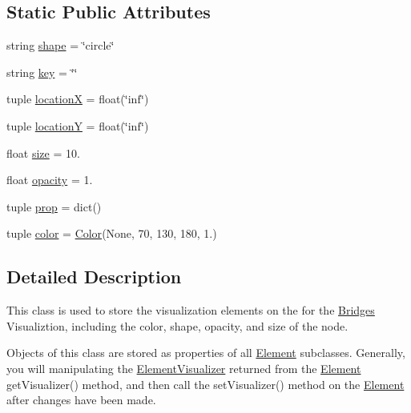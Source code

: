 \subsection*{Static Public Attributes}
\begin{DoxyCompactItemize}
\item 
string \hyperlink{class_bridges_1_1_element_visualizer_1_1_element_visualizer_a1ae8dcb88a4ccb84df24aafed271ea7f}{shape} = \char`\"{}circle\char`\"{}
\item 
string \hyperlink{class_bridges_1_1_element_visualizer_1_1_element_visualizer_ae811539c6b7d514dcaead30f0288c87d}{key} = \char`\"{}\char`\"{}
\item 
tuple \hyperlink{class_bridges_1_1_element_visualizer_1_1_element_visualizer_a0e49a616ae03929c2fd740d4c63d6783}{location\+X} = float(\char`\"{}inf\char`\"{})
\item 
tuple \hyperlink{class_bridges_1_1_element_visualizer_1_1_element_visualizer_a1a06bb4d054141091b03a4268f15f80f}{location\+Y} = float(\char`\"{}inf\char`\"{})
\item 
float \hyperlink{class_bridges_1_1_element_visualizer_1_1_element_visualizer_a5d3eefae7745c6db65147c7b1361d208}{size} = 10.
\item 
float \hyperlink{class_bridges_1_1_element_visualizer_1_1_element_visualizer_ab26841a89ad63bac0828c15b01ec92b2}{opacity} = 1.
\item 
tuple \hyperlink{class_bridges_1_1_element_visualizer_1_1_element_visualizer_a2e49fbb5c1af13475adb6ac5af46ee3e}{prop} = dict()
\item 
tuple \hyperlink{class_bridges_1_1_element_visualizer_1_1_element_visualizer_aa0ac460519bff4077ed6c216f87f61fe}{color} = \hyperlink{class_bridges_1_1_color_1_1_color}{Color}(None, 70, 130, 180, 1.)
\end{DoxyCompactItemize}


\subsection{Detailed Description}
This class is used to store the visualization elements on the for the \hyperlink{namespace_bridges_1_1_bridges}{Bridges} Visualiztion, including the color, shape, opacity, and size of the node. 

Objects of this class are stored as properties of all \hyperlink{namespace_bridges_1_1_element}{Element} subclasses. Generally, you will manipulating the \hyperlink{class_bridges_1_1_element_visualizer_1_1_element_visualizer}{Element\+Visualizer} returned from the \hyperlink{namespace_bridges_1_1_element}{Element} get\+Visualizer() method, and then call the set\+Visualizer() method on the \hyperlink{namespace_bridges_1_1_element}{Element} after changes have been made. 

